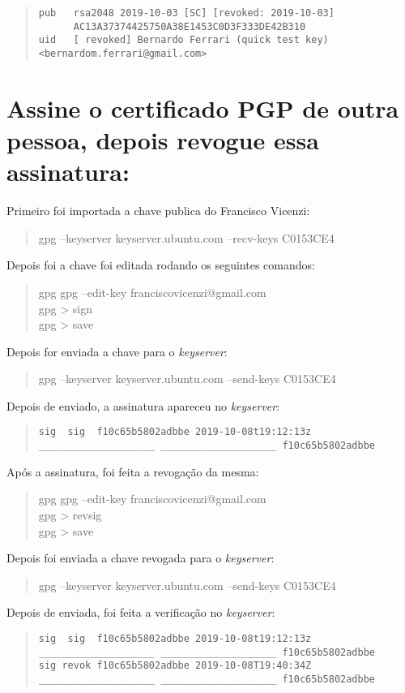 \documentclass[12pt, letterpaper]{article}
\begin{document}
\begin{quote}
\begin{verbatim}
pub   rsa2048 2019-10-03 [SC] [revoked: 2019-10-03]
      AC13A37374425750A38E1453C0D3F333DE42B310
uid   [ revoked] Bernardo Ferrari (quick test key)
<bernardom.ferrari@gmail.com>
\end{verbatim}
\end{quote}

\section{Assine o certificado PGP de outra pessoa,
depois revogue essa assinatura:}

Primeiro foi importada a chave publica do Francisco Vicenzi:
\begin{quote}
  gpg --keyserver keyserver.ubuntu.com --recv-keys C0153CE4
\end{quote}
Depois foi a chave foi editada rodando os seguintes comandos:
\begin{quote}
  gpg gpg --edit-key franciscovicenzi@gmail.com \\
  gpg \textgreater{} sign \\
  gpg \textgreater{} save
\end{quote}
Depois for enviada a chave para o \textit{keyserver}:
\begin{quote}
  gpg --keyserver keyserver.ubuntu.com --send-keys C0153CE4
\end{quote}
Depois de enviado, a assinatura apareceu no \textit{keyserver}:
\begin{quote}
\begin{verbatim}
sig  sig  f10c65b5802adbbe 2019-10-08t19:12:13z
____________________ ____________________ f10c65b5802adbbe
\end{verbatim}
\end{quote}

Após a assinatura, foi feita a revogação da mesma:
\begin{quote}
  gpg gpg --edit-key franciscovicenzi@gmail.com \\
  gpg \textgreater{} revsig \\
  gpg \textgreater{} save
\end{quote}
Depois foi enviada a chave revogada para o \textit{keyserver}:
\begin{quote}
  gpg --keyserver keyserver.ubuntu.com --send-keys C0153CE4
\end{quote}
Depois de enviada, foi feita a verificação no \textit{keyserver}:
\begin{quote}
\begin{verbatim}
sig  sig  f10c65b5802adbbe 2019-10-08t19:12:13z
____________________ ____________________ f10c65b5802adbbe
sig revok f10c65b5802adbbe 2019-10-08T19:40:34Z
____________________ ____________________ f10c65b5802adbbe
\end{verbatim}
\end{quote}
\end{document}
